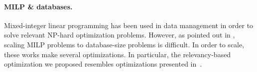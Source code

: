 \paragraph*{\textbf{MILP \& databases.}} Mixed-integer linear programming has been used in data management in order to solve relevant {\sf NP-hard} optimization problems. However, as pointed out in \cite{Tiresias,QFix,BAM18,PackageQueriesScale}, scaling MILP problems to database-size problems is difficult. In order to scale, these works make several optimizations. In particular, the relevancy-based optimization we proposed resembles optimizations presented in~\cite{QFix,Tiresias}.





